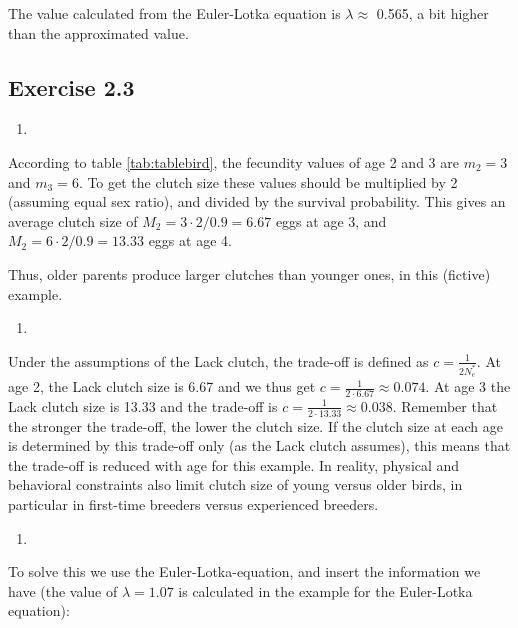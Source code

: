 \documentclass[
]{book}
\providecommand{\tightlist}{%
  \setlength{\itemsep}{0pt}\setlength{\parskip}{0pt}}
\begin{document}
The value calculated from the Euler-Lotka equation is \(\lambda\approx\) 0.565, a bit higher than the approximated value.

\hypertarget{exercise-2.3-1}{%
\subsection*{Exercise 2.3}\label{exercise-2.3-1}}

\begin{enumerate}
\def\labelenumi{\arabic{enumi}.}
\tightlist
\item
\end{enumerate}

According to table \ref{tab:tablebird}, the fecundity values of age 2 and 3 are \(m_2=3\) and \(m_3=6\). To get the clutch size these values should be multiplied by 2 (assuming equal sex ratio), and divided by the survival probability. This gives an average clutch size of \(M_2=3\cdot2/0.9=6.67\) eggs at age 3, and \(M_2=6\cdot2/0.9=13.33\) eggs at age 4.

Thus, older parents produce larger clutches than younger ones, in this (fictive) example.

\begin{enumerate}
\def\labelenumi{\arabic{enumi}.}
\setcounter{enumi}{1}
\tightlist
\item
\end{enumerate}

Under the assumptions of the Lack clutch, the trade-off is defined as \(c=\frac{1}{2N_e^*}\). At age 2, the Lack clutch size is 6.67 and we thus get \(c=\frac{1}{2\cdot6.67}\approx 0.074\). At age 3 the Lack clutch size is 13.33 and the trade-off is \(c=\frac{1}{2\cdot13.33}\approx 0.038\). Remember that the stronger the trade-off, the lower the clutch size. If the clutch size at each age is determined by this trade-off only (as the Lack clutch assumes), this means that the trade-off is reduced with age for this example. In reality, physical and behavioral constraints also limit clutch size of young versus older birds, in particular in first-time breeders versus experienced breeders.

\begin{enumerate}
\def\labelenumi{\arabic{enumi}.}
\setcounter{enumi}{2}
\tightlist
\item
\end{enumerate}

To solve this we use the Euler-Lotka-equation, and insert the information we have (the value of \(\lambda=1.07\) is calculated in the example for the Euler-Lotka equation):
\end{document}
